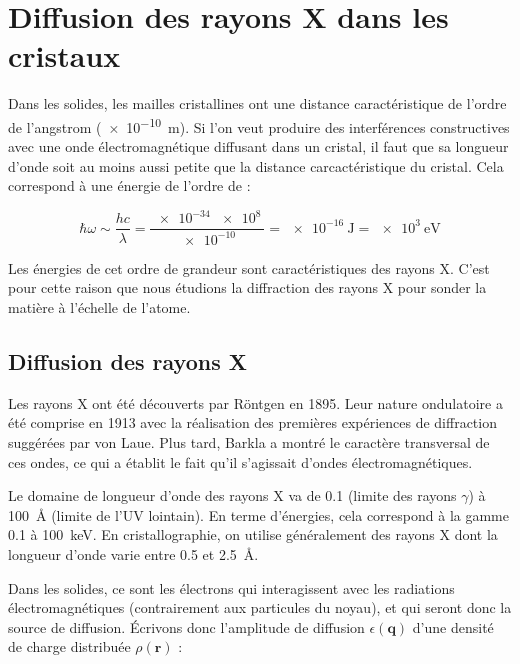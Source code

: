 \chapter{Diffusion des rayons X dans les cristaux}

Dans les solides, les mailles cristallines ont une distance caractéristique de l'ordre de l'angstrom (\SI{e-10}{\metre}). Si l'on veut produire des interférences constructives avec une onde électromagnétique diffusant dans un cristal, il faut que sa longueur d'onde soit au moins aussi petite que la distance carcactéristique du cristal. Cela correspond à une énergie de l'ordre de :

\begin{equation}
\hbar \omega \sim \frac{hc}{\lambda} = \frac{\SI{e-34}{}\SI{e8}{}}{\SI{e-10}{}} = \SI{e-16}{\joule} = \SI{e3}{\electronvolt}
\end{equation}

Les énergies de cet ordre de grandeur sont caractéristiques des rayons X. C'est pour cette raison que nous étudions la diffraction des rayons X pour sonder la matière à l'échelle de l'atome.

\section{Diffusion des rayons X}

Les rayons X ont été découverts par Röntgen en 1895. Leur nature ondulatoire a
été comprise en 1913 avec la réalisation des premières expériences de
diffraction suggérées par von Laue. Plus tard, Barkla a montré le caractère
transversal de ces ondes, ce qui a établit le fait qu'il s'agissait d'ondes
électromagnétiques.

Le domaine de longueur d'onde des rayons X va de 0.1 (limite des rayons
$\gamma$) à \SI{100}{\angstrom} (limite de l'UV lointain). En terme d'énergies,
cela correspond à la gamme 0.1 à \SI{100}{\kilo\electronvolt}. En
cristallographie, on utilise généralement des rayons X dont la longueur d'onde 
varie entre 0.5 et \SI{2.5}{\angstrom}.

Dans les solides, ce sont les électrons qui interagissent avec les radiations électromagnétiques (contrairement aux particules du noyau), et qui seront donc la source de diffusion. Écrivons donc l'amplitude de diffusion
$\epsilon(\mathbf{q})$ d'une densité de charge distribuée $\rho(\mathbf{r})$ :

